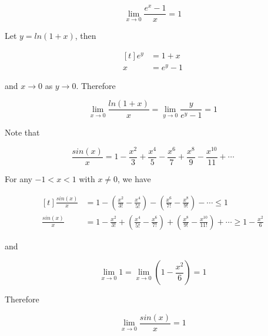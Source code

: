 \begin{thm}
  $$\lim_{x\to 0}\frac{e^{x}-1}{x}=1$$\s

   Let $y=ln(1+x)$, then

  $$\begin{aligned}[t]
    e^{y}&=1+x\\
    x&=e^{y}-1
  \end{aligned}$$\s

  and $x\to 0$ as $y\to 0$. Therefore

  $$\lim_{x\to 0}\frac{ln(1+x)}{x}=\lim_{y\to 0}\frac{y}{e^{y}-1}=1$$\s

   Note that

  $$\frac{sin(x)}{x}=1-\frac{x^{2}}{3}+\frac{x^{4}}{5}-\frac{x^{6}}{7}+\frac{x^{8}}{9}-\frac{x^{10}}{11}+\cdots$$\s

  For any $-1<x<1$ with $x\neq 0$, we have

  $$\begin{aligned}[t]
    \frac{sin(x)}{x}&=1-(\frac{x^{2}}{3!}-\frac{x^{4}}{5!})-(\frac{x^{6}}{7!}-\frac{x^{8}}{9!})-\cdots \leq 1\\
    \frac{sin(x)}{x}&=1-\frac{x^{2}}{3!}+(\frac{x^{4}}{5!}-\frac{x^{6}}{7!})+(\frac{x^{8}}{9!}-\frac{x^{10}}{11!})+\cdots \geq 1-\frac{x^{2}}{6}
  \end{aligned}$$\s

  and

  $$\lim_{x\to 0}1=\lim_{x\to 0}(1-\frac{x^{2}}{6})=1$$

  Therefore

  $$\lim_{x\to 0}\frac{sin(x)}{x}=1$$
\end{thm}

